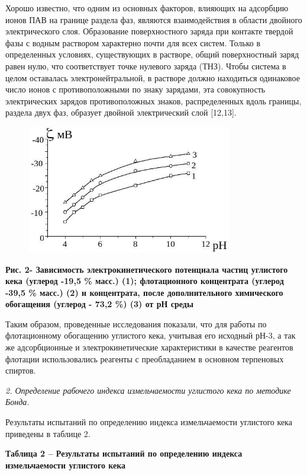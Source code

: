 Хорошо известно, что одним из основных факторов, влияющих на адсорбцию
ионов ПАВ на границе раздела фаз, являются взаимодействия в области
двойного электрического слоя. Образование поверхностного заряда при
контакте твердой фазы с водным раствором характерно почти для всех
систем. Только в определенных условиях, существующих в растворе, общий
поверхностный заряд равен нулю, что соответствует точке нулевого заряда
(ТНЗ). Чтобы система в целом оставалась электронейтральной, в растворе
должно находиться одинаковое число ионов с противоположными по знаку
зарядами, эта совокупность электрических зарядов противоположных знаков,
распределенных вдоль границы, раздела двух фаз, образует двойной
электрический слой {[}12,13{]}.

\begin{figure}[H]
	\centering
	\includegraphics[width=0.8\textwidth]{assets/1035}
	\caption*{}
\end{figure}

{\bfseries Рис. 2- Зависимость электрокинетического потенциала частиц
углистого кека (углерод -19,5 \% масс.) (1); флотационного концентрата
(углерод -39,5 \% масс.) (2) и концентрата, после дополнительного
химического обогащения (углерод - 73,2 \%) (3) от рН среды}

Таким образом, проведенные исследования показали, что для работы по
флотационному обогащению углистого кека, учитывая его исходный рН-3, а
так же адсорбционные и электрокинетические характеристики в качестве
реагентов флотации использовались реагенты с преобладанием в основном
терпеновых спиртов.

\emph{2. Определение рабочего индекса измельчаемости углистого кека по
методике Бонда.}

Результаты испытаний по определению индекса измельчаемости углистого
кека приведены в таблице 2.

{\bfseries Таблица 2 -- Результаты испытаний по определению индекса
измельчаемости углистого кека}

